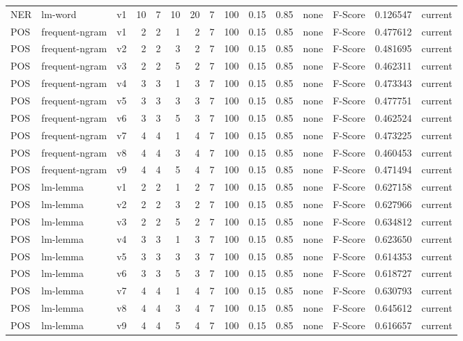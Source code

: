 \documentclass{article}
\begin{document}
\begin{xltabular}{\linewidth}{@{}lYcrrrrrrrrYlrl@{}}
NER & lm-word & v1 & 10 & 7 & 10 & 20 & 7 & 100 & 0.15 & 0.85 & none & F-Score & 0.126547 & current \\
POS & frequent-ngram & v1 & 2 & 2 & 1 & 2 & 7 & 100 & 0.15 & 0.85 & none & F-Score & 0.477612 & current \\
POS & frequent-ngram & v2 & 2 & 2 & 3 & 2 & 7 & 100 & 0.15 & 0.85 & none & F-Score & 0.481695 & current \\
POS & frequent-ngram & v3 & 2 & 2 & 5 & 2 & 7 & 100 & 0.15 & 0.85 & none & F-Score & 0.462311 & current \\
POS & frequent-ngram & v4 & 3 & 3 & 1 & 3 & 7 & 100 & 0.15 & 0.85 & none & F-Score & 0.473343 & current \\
POS & frequent-ngram & v5 & 3 & 3 & 3 & 3 & 7 & 100 & 0.15 & 0.85 & none & F-Score & 0.477751 & current \\
POS & frequent-ngram & v6 & 3 & 3 & 5 & 3 & 7 & 100 & 0.15 & 0.85 & none & F-Score & 0.462524 & current \\
POS & frequent-ngram & v7 & 4 & 4 & 1 & 4 & 7 & 100 & 0.15 & 0.85 & none & F-Score & 0.473225 & current \\
POS & frequent-ngram & v8 & 4 & 4 & 3 & 4 & 7 & 100 & 0.15 & 0.85 & none & F-Score & 0.460453 & current \\
POS & frequent-ngram & v9 & 4 & 4 & 5 & 4 & 7 & 100 & 0.15 & 0.85 & none & F-Score & 0.471494 & current \\
POS & lm-lemma & v1 & 2 & 2 & 1 & 2 & 7 & 100 & 0.15 & 0.85 & none & F-Score & 0.627158 & current \\
POS & lm-lemma & v2 & 2 & 2 & 3 & 2 & 7 & 100 & 0.15 & 0.85 & none & F-Score & 0.627966 & current \\
POS & lm-lemma & v3 & 2 & 2 & 5 & 2 & 7 & 100 & 0.15 & 0.85 & none & F-Score & 0.634812 & current \\
POS & lm-lemma & v4 & 3 & 3 & 1 & 3 & 7 & 100 & 0.15 & 0.85 & none & F-Score & 0.623650 & current \\
POS & lm-lemma & v5 & 3 & 3 & 3 & 3 & 7 & 100 & 0.15 & 0.85 & none & F-Score & 0.614353 & current \\
POS & lm-lemma & v6 & 3 & 3 & 5 & 3 & 7 & 100 & 0.15 & 0.85 & none & F-Score & 0.618727 & current \\
POS & lm-lemma & v7 & 4 & 4 & 1 & 4 & 7 & 100 & 0.15 & 0.85 & none & F-Score & 0.630793 & current \\
POS & lm-lemma & v8 & 4 & 4 & 3 & 4 & 7 & 100 & 0.15 & 0.85 & none & F-Score & 0.645612 & current \\
POS & lm-lemma & v9 & 4 & 4 & 5 & 4 & 7 & 100 & 0.15 & 0.85 & none & F-Score & 0.616657 & current \\

\end{xltabular}
\end{document}
